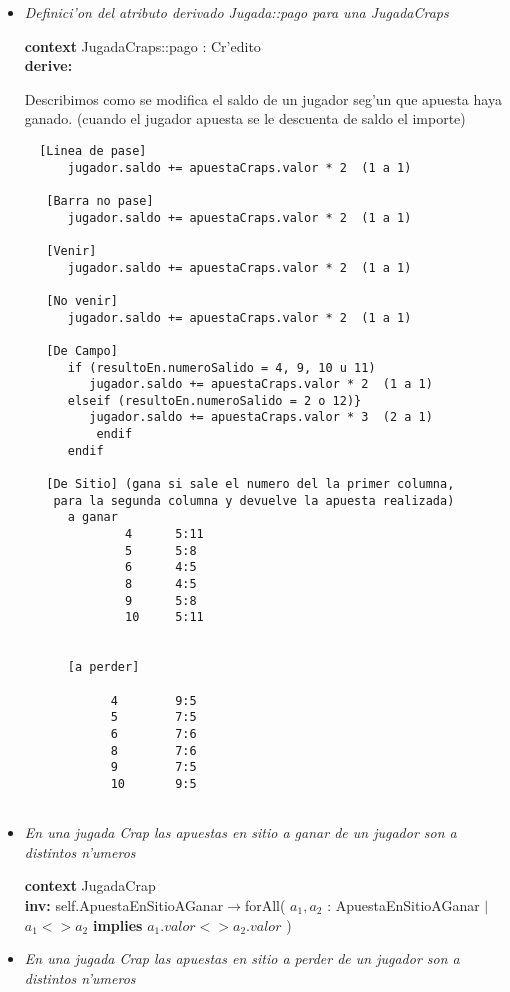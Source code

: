 \begin{itemize}
\clearpage

\item \textit{Definici'on del atributo derivado Jugada::pago para una JugadaCraps}

\textbf{context} JugadaCraps::pago : Cr'edito \\ \textbf{derive:}

Describimos como se modifica el saldo de un jugador seg'un que apuesta haya ganado. 
(cuando el jugador apuesta se le descuenta de saldo el importe)

\begin{verbatim}
  [Linea de pase]
      jugador.saldo += apuestaCraps.valor * 2  (1 a 1)

   [Barra no pase]
      jugador.saldo += apuestaCraps.valor * 2  (1 a 1)

   [Venir]
      jugador.saldo += apuestaCraps.valor * 2  (1 a 1)

   [No venir] 
      jugador.saldo += apuestaCraps.valor * 2  (1 a 1)

   [De Campo]
      if (resultoEn.numeroSalido = 4, 9, 10 u 11) 
         jugador.saldo += apuestaCraps.valor * 2  (1 a 1)
      elseif (resultoEn.numeroSalido = 2 o 12)}
         jugador.saldo += apuestaCraps.valor * 3  (2 a 1)
          endif
      endif

   [De Sitio] (gana si sale el numero del la primer columna, 
    para la segunda columna y devuelve la apuesta realizada)
      a ganar 
              4      5:11  
              5      5:8  
              6      4:5  
              8      4:5  
              9      5:8  
              10     5:11 


      [a perder]

            4        9:5  
            5        7:5  
            6        7:6  
            8        7:6  
            9        7:5  
            10       9:5  
      
\end{verbatim}


\clearpage


\item\textit{ En una jugada Crap las apuestas en sitio a ganar de un jugador son a distintos n'umeros}

\textbf{context}  JugadaCrap \\ \textbf{inv:} 
  self.ApuestaEnSitioAGanar$\rightarrow$forAll( $a_{1}, a_{2}$ : ApuestaEnSitioAGanar $ | $ $ a_{1} <> a_{2} $  \textbf{implies} $ a_{1}.valor <> a_{2}.valor $ )


\item\textit{ En una jugada Crap las apuestas en sitio a perder de un jugador son a distintos n'umeros}


\end{itemize}
